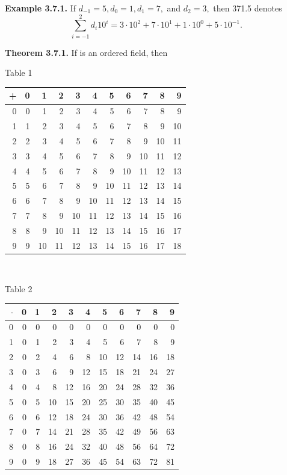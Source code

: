 \begin{large}
\textbf{Example 3.7.1.} If $d_{-1} = 5, d_{0} = 1, d_{1} = 7,$ and $d_{2} = 3,$ then 371.5 denotes
\[
\sum_{i=-1}^{2} d_{i}10^{i} =3\cdot 10^{2} + 7\cdot 10^{1} + 1\cdot 10^{0}+ 5\cdot 10^{-1}.
\]

\textbf{Theorem 3.7.1.} If \of  is an ordered field, then

\newpage
\begin{center}

\qqu  Table 1\nl

\begin{tabular}{|r| r| r| r| r| r| r| r| r| r| r |}\hline
+& 0&1& 2& 3& 4& 5& 6& 7& 8& 9  \\ \hline
0& 0&1& 2& 3& 4& 5& 6& 7& 8& 9 \\ \hline
1&1&2&3&4&5&6&7&8&9&10\\ \hline
2&2&3&4&5&6&7&8&9&10&11 \\ \hline
3&3&4&5&6&7&8&9&10&11&12 \\ \hline
4&4&5&6&7&8&9&10&11&12&13  \\ \hline
5&5&6&7&8&9&10&11&12&13&14 \\ \hline
6&6&7&8&9&10&11&12&13&14&15 \\ \hline
7&7&8&9&10&11&12&13&14&15&16 \\ \hline
8&8&9&10&11&12&13&14&15&16&17 \\ \hline
9&9&10&11&12&13&14&15&16&17&18 \\ \hline
\end{tabular}\nl

$ $\nl

\qqu  Table 2\nl

\begin{tabular}{|r| r| r| r| r| r| r| r| r| r| r |}\hline
$\cdot$& 0&1&2&3&4&5&6&7&8&9 \\ \hline
0&0&0&0&0&0&0&0&0&0&0 \\ \hline
1&0&1&2&3&4&5&6&7&8&9 \\ \hline
2&0&2&4&6&8&10&12&14&16&18 \\ \hline
3&0&3&6&9&12&15&18&21&24&27 \\ \hline
4&0&4&8&12&16&20&24&28&32&36 \\ \hline
5&0&5&10&15&20&25&30&35&40&45 \\ \hline
6&0&6&12&18&24&30&36&42&48&54 \\ \hline
7&0&7&14&21&28&35&42&49&56&63 \\ \hline
8&0&8&16&24&32&40&48&56&64&72 \\ \hline
9&0&9&18&27&36&45&54&63&72&81 \\ \hline
\end{tabular}\nl


\end{center}
\end{large}
